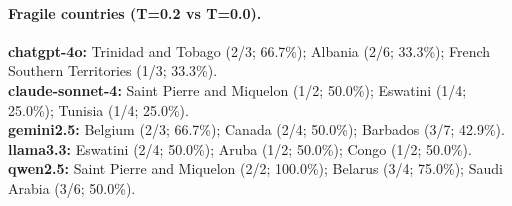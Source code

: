 \paragraph{Fragile countries (T=0.2 vs T=0.0).}
\textbf{chatgpt-4o:} Trinidad and Tobago (2/3; 66.7\%); Albania (2/6; 33.3\%); French Southern Territories (1/3; 33.3\%). \\
\textbf{claude-sonnet-4:} Saint Pierre and Miquelon (1/2; 50.0\%); Eswatini (1/4; 25.0\%); Tunisia (1/4; 25.0\%). \\
\textbf{gemini2.5:} Belgium (2/3; 66.7\%); Canada (2/4; 50.0\%); Barbados (3/7; 42.9\%). \\
\textbf{llama3.3:} Eswatini (2/4; 50.0\%); Aruba (1/2; 50.0\%); Congo (1/2; 50.0\%). \\
\textbf{qwen2.5:} Saint Pierre and Miquelon (2/2; 100.0\%); Belarus (3/4; 75.0\%); Saudi Arabia (3/6; 50.0\%).
